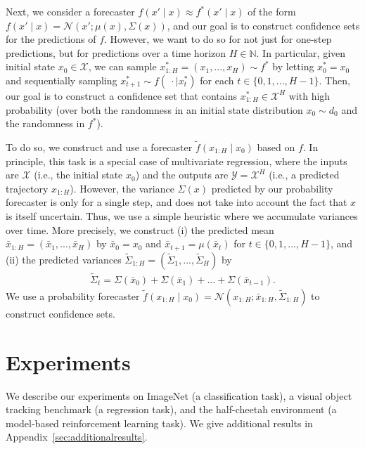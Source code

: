 \documentclass{article} \usepackage{iclr2020_conference,times}
\renewcommand{\(}						{\left(}
\renewcommand{\)}						{\right)}
\renewcommand{\[}						{\left[}
\renewcommand{\]}						{\right]}
\newcommand{\<}						{\left<}
\renewcommand{\>}						{\right>}
\begin{document}
Next, we consider a forecaster $f(x'\mid x)\approx f^*(x' \mid x)$ of the form $f(x'\mid x)=\mathcal{N}(x';\mu(x),\Sigma(x))$, and our goal is to construct confidence sets for the predictions of $f$. However, we want to do so for not just for one-step predictions, but for predictions over a time horizon $H\in\mathbb{N}$. In particular, given initial state $x_0\in\mathcal{X}$, we can sample $x_{1:H}^*=(x_1,...,x_H)\sim f^*$ by letting $x_0^*=x_0$ and sequentially sampling $x_{t+1}^*\sim f(~\cdot\mid x_t^*)$ for each $t\in\{0,1,...,H-1\}$. Then, our goal is to construct a confidence set that contains $x_{1:H}^*\in\mathcal{X}^H$ with high probability (over both the randomness in an initial state distribution $x_0\sim d_0$ and the randomness in $f^*$).

To do so, we construct and use a forecaster $\tilde f(x_{1:H}\mid x_0)$ based on $f$. In principle, this task is a special case of multivariate regression, where the inputs are $\mathcal{X}$ (i.e., the initial state $x_0$) and the outputs are $\mathcal{Y}=\mathcal{X}^H$ (i.e., a predicted trajectory $x_{1:H}$). However, the variance $\Sigma(x)$ predicted by our probability forecaster is only for a single step, and does not take into account the fact that $x$ is itself uncertain. Thus, we use a simple heuristic where we accumulate variances over time. More precisely, we construct (i) the predicted mean $\bar{x}_{1:H}=(\bar{x}_1,...,\bar{x}_H)$ by $\bar{x}_0=x_0$ and $\bar{x}_{t+1}=\mu(\bar{x}_t)$ for $t\in\{0,1,...,H-1\}$, and (ii) the predicted variances $\tilde{\Sigma}_{1:H}=(\tilde\Sigma_1,...,\tilde\Sigma_H)$ by
\begin{align*}
\tilde\Sigma_t=\Sigma(\bar{x}_0)+\Sigma(\bar{x}_1)+...+\Sigma(\bar{x}_{t-1}).
\end{align*}
We use a probability forecaster $\tilde{f}(x_{1:H}\mid x_0)=\mathcal{N}(x_{1:H};\bar{x}_{1:H},\tilde\Sigma_{1:H})$ to construct confidence sets.
 

\section{Experiments}
\label{sec:experiments}

We describe our experiments on ImageNet (a classification task), a visual object tracking benchmark (a regression task), and the half-cheetah environment (a model-based reinforcement learning task). We give additional results in Appendix~\ref{sec:additionalresults}.
\end{document}

